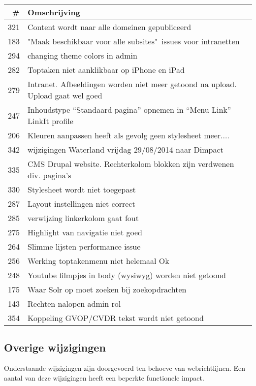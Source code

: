 \documentclass[12pt]{article}
\begin{document}
\begin{tabular}{| r | p{15cm} |}
	\hline \# & Omschrijving \\ \hline \hline
	321 & Content wordt naar alle domeinen gepubliceerd \\ \hline
	183 & "Maak beschikbaar voor alle subsites"\, issues
		voor intranetten \\ \hline
	294 & changing theme colors in admin \\ \hline
	282 & Toptaken niet aanklikbaar op iPhone en iPad \\ \hline
	279 & Intranet. Afbeeldingen worden niet meer
		getoond na upload. Upload gaat wel goed \\ \hline
	247 & Inhoudstype ``Standaard pagina'' opnemen
		in ``Menu Link'' LinkIt profile \\ \hline
	206 & Kleuren aanpassen heeft als gevolg geen
		stylesheet meer.... \\ \hline
	342 & wijzigingen Waterland vrijdag 29/08/2014 naar Dimpact \\ \hline
	335 & CMS Drupal website. Rechterkolom blokken
		zijn verdwenen div. pagina's \\ \hline
	330 & Stylesheet wordt niet toegepast \\ \hline
	287 & Layout instellingen niet correct \\ \hline
	285 & verwijzing linkerkolom gaat fout \\ \hline
	275 & Highlight van navigatie niet goed \\ \hline
	264 & Slimme lijsten performance issue \\ \hline
	256 & Werking toptakenmenu niet helemaal Ok \\ \hline
	248 & Youtube filmpjes in body (wysiwyg) worden niet getoond \\ \hline
	175 & Waar Solr op moet zoeken bij zoekopdrachten \\ \hline
	143 & Rechten nalopen admin rol \\ \hline
	354 & Koppeling GVOP/CVDR tekst wordt niet getoond \\ \hline
\end{tabular}

\subsection{Overige wijzigingen}

Onderstaande wijzigingen zijn doorgevoerd ten behoeve van webrichtlijnen. Een aantal van deze wijzigingen heeft een beperkte functionele impact.
\end{document}
